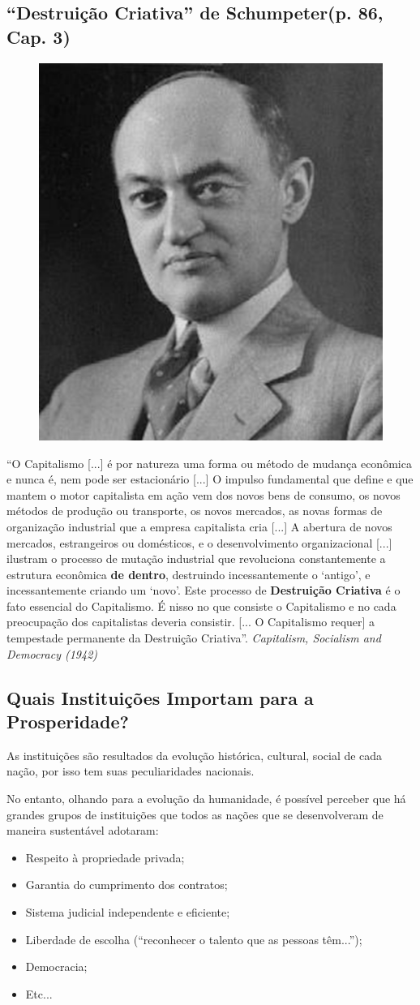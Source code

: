 \documentclass[a4paper,12pt]{article}[abntex2]
\begin{document}
\subsection{\textbf{“Destruição Criativa” de Schumpeter(p. 86, Cap. 3)}}
\begin{figure}[H]
    \centering
    \includegraphics[width=0.5\linewidth]{Imagens/a2i7.png}
\end{figure}
“O Capitalismo [...] é por natureza uma forma ou método de mudança econômica e nunca é, nem pode ser estacionário [...] O impulso fundamental que define e que mantem o motor capitalista em ação vem dos novos bens de consumo, os novos métodos de produção ou transporte, os novos mercados, as novas formas de organização industrial que a empresa capitalista cria [...] A abertura de novos mercados, estrangeiros ou domésticos, e o desenvolvimento organizacional [...] ilustram o processo de mutação industrial que revoluciona constantemente a estrutura econômica \textbf{de dentro}, destruindo incessantemente o ‘antigo’, e incessantemente criando um ‘novo’. Este processo de \textbf{Destruição Criativa }é o fato essencial do Capitalismo. É nisso no que consiste o Capitalismo e no cada preocupação dos capitalistas deveria consistir. [... O Capitalismo requer] a tempestade permanente da Destruição Criativa”. \textit{Capitalism, Socialism and Democracy (1942)}

\subsection{\textbf{Quais Instituições Importam para a Prosperidade?}}
As instituições são resultados da evolução histórica, cultural, social de cada nação, por isso tem suas peculiaridades nacionais.

No entanto, olhando para a evolução da humanidade, é possível perceber que há grandes grupos de instituições que todos as nações que se desenvolveram de maneira sustentável adotaram:\begin{itemize}
    \item Respeito à propriedade privada;
    \item Garantia do cumprimento dos contratos;
    \item Sistema judicial independente e eficiente;
    \item Liberdade de escolha (“reconhecer o talento que as pessoas têm...”);
    \item Democracia;
    \item Etc... 
\end{itemize}
\end{document}
